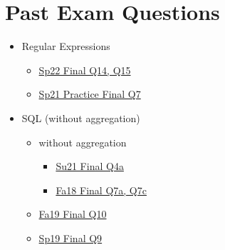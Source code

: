 \documentclass{exam}
\begin{document}
\section*{Past Exam Questions}
\begin{itemize}
    \item Regular Expressions
    \begin{itemize}
        \item \href{https://cs61a.org/exam/sp22/final/61a-sp22-final.pdf#page=31}{Sp22 Final Q14, Q15}
        \item \href{https://cs61a.org/exam/sp21/practice-final/61a-sp21-practice-final.pdf#page=24}{Sp21 Practice Final Q7}
    \end{itemize}
    \item SQL (without aggregation)
    \begin{itemize}
        \item without aggregation
        \begin{itemize}
            \item \href{https://cs61a.org/exam/su21/final/61a-su21-final.pdf#page=16}{Su21 Final Q4a}
            \item \href{https://inst.eecs.berkeley.edu/~cs61a/fa18/assets/pdfs/61a-fa18-final.pdf#page=9}{Fa18 Final Q7a, Q7c}
        \end{itemize}
        \item \href{https://cs61a.org/exam/fa19/final/61a-fa19-final.pdf#page=11}{Fa19 Final Q10}
        \item \href{https://cs61a.org/exam/sp19/final/61a-sp19-final.pdf#page=9}{Sp19 Final Q9}
    \end{itemize}
\end{itemize}
\end{document}
